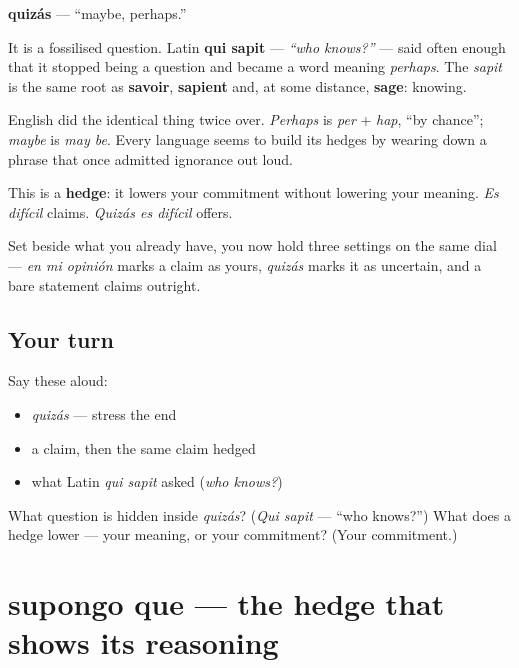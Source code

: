 \begin{cousinweb}
\textbf{quizás} — \textquotedblleft{}maybe, perhaps.\textquotedblright{}

It is a fossilised question. Latin \textbf{qui sapit} — \emph{\textquotedblleft{}who knows?\textquotedblright{}} — said often enough that it stopped being a question and became a word meaning \emph{perhaps}. The \emph{sapit} is the same root as \textbf{savoir}, \textbf{sapient} and, at some distance, \textbf{sage}: knowing.

English did the identical thing twice over. \emph{Perhaps} is \emph{per} + \emph{hap}, \textquotedblleft{}by chance\textquotedblright{}; \emph{maybe} is \emph{may be}. Every language seems to build its hedges by wearing down a phrase that once admitted ignorance out loud.
\end{cousinweb}

\begin{grammarlens}[title={What you've built}]
This is a \textbf{hedge}: it lowers your commitment without lowering your meaning. \emph{Es difícil} claims. \emph{Quizás es difícil} offers.

Set beside what you already have, you now hold three settings on the same dial — \emph{en mi opinión} marks a claim as yours, \emph{quizás} marks it as uncertain, and a bare statement claims outright.
\end{grammarlens}

\subsection*{Your turn}
Say these aloud:

\begin{itemize}
\raggedright
  \item \emph{quizás} — stress the end
  \item a claim, then the same claim hedged
  \item what Latin \emph{qui sapit} asked (\emph{who knows?})
\end{itemize}

\begin{tcolorbox}[breakable,colback=teal!4,colframe=teal!35!black,title={Before you move on}]
What question is hidden inside \emph{quizás}? (\emph{Qui sapit} — \textquotedblleft{}who knows?\textquotedblright{}) What does a hedge lower — your meaning, or your commitment? (Your commitment.)
\end{tcolorbox}
\section[supongo que]{supongo que — the hedge that shows its reasoning}

